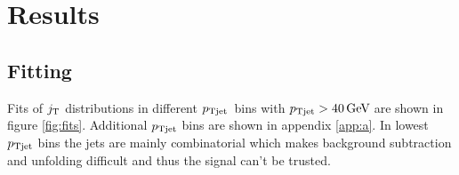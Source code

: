 \FloatBarrier
\section{Results}
\label{sec:results}



%









\subsection{Fitting}
Fits of $j_{\rm T}$ distributions in different $p_{\rm Tjet}$ bins with $\pt{jet}  > \unit[40]{\gev}$ are shown in figure \ref{fig:fits}. Additional $p_{\rm Tjet}$ bins are shown in appendix \ref{app:a}. In lowest $p_{\rm Tjet}$ bins the jets are mainly combinatorial which makes background subtraction and unfolding difficult and thus the signal can't be trusted. 

